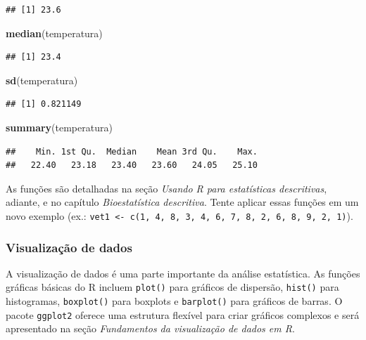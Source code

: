 \documentclass[
]{book}
\newenvironment{Shaded}{\begin{snugshade}}{\end{snugshade}}
\newcommand{\FunctionTok}[1]{\textcolor[rgb]{0.13,0.29,0.53}{\textbf{#1}}}
\newcommand{\NormalTok}[1]{#1}
\begin{document}
\begin{verbatim}
## [1] 23.6
\end{verbatim}

\begin{Shaded}
\begin{Highlighting}[]
\FunctionTok{median}\NormalTok{(temperatura)}
\end{Highlighting}
\end{Shaded}

\begin{verbatim}
## [1] 23.4
\end{verbatim}

\begin{Shaded}
\begin{Highlighting}[]
\FunctionTok{sd}\NormalTok{(temperatura)}
\end{Highlighting}
\end{Shaded}

\begin{verbatim}
## [1] 0.821149
\end{verbatim}

\begin{Shaded}
\begin{Highlighting}[]
\FunctionTok{summary}\NormalTok{(temperatura)}
\end{Highlighting}
\end{Shaded}

\begin{verbatim}
##    Min. 1st Qu.  Median    Mean 3rd Qu.    Max. 
##   22.40   23.18   23.40   23.60   24.05   25.10
\end{verbatim}

As funções são detalhadas na seção \emph{Usando R para estatísticas descritivas}, adiante, e no capítulo \emph{Bioestatística descritiva}. Tente aplicar essas funções em um novo exemplo (ex.: \texttt{vet1\ \textless{}-\ c(1,\ 4,\ 8,\ 3,\ 4,\ 6,\ 7,\ 8,\ 2,\ 6,\ 8,\ 9,\ 2,\ 1)}).

\subsubsection{Visualização de dados}\label{visualizauxe7uxe3o-de-dados}

A visualização de dados é uma parte importante da análise estatística. As funções gráficas básicas do R incluem \texttt{plot()} para gráficos de dispersão, \texttt{hist()} para histogramas, \texttt{boxplot()} para boxplots e \texttt{barplot()} para gráficos de barras. O pacote \texttt{ggplot2} oferece uma estrutura flexível para criar gráficos complexos e será apresentado na seção \emph{Fundamentos da visualização de dados em R}.
\end{document}
